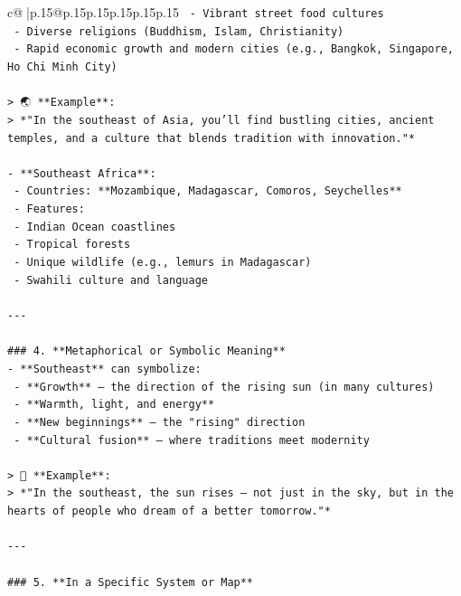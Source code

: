\documentclass{article}
\begin{document}
{\begin{supertabular}{c@{$\;$}|p{.15\linewidth}@{}p{.15\linewidth}p{.15\linewidth}p{.15\linewidth}p{.15\linewidth}p{.15\linewidth}}
{{{\texttt{    {-} Vibrant street food cultures  } \\
\texttt{    {-} Diverse religions (Buddhism, Islam, Christianity)  } \\
\texttt{    {-} Rapid economic growth and modern cities (e.g., Bangkok, Singapore, Ho Chi Minh City)} \\
\\ 
\texttt{> 🌏 **Example**:  } \\
\texttt{> *"In the southeast of Asia, you’ll find bustling cities, ancient temples, and a culture that blends tradition with innovation."*} \\
\\ 
\texttt{{-} **Southeast Africa**:  } \\
\texttt{  {-} Countries: **Mozambique, Madagascar, Comoros, Seychelles**  } \\
\texttt{  {-} Features:  } \\
\texttt{    {-} Indian Ocean coastlines  } \\
\texttt{    {-} Tropical forests  } \\
\texttt{    {-} Unique wildlife (e.g., lemurs in Madagascar)  } \\
\texttt{    {-} Swahili culture and language} \\
\\ 
\texttt{{-}{-}{-}} \\
\\ 
\texttt{\#\#\# 4. **Metaphorical or Symbolic Meaning**  } \\
\texttt{{-} **Southeast** can symbolize:  } \\
\texttt{  {-} **Growth** — the direction of the rising sun (in many cultures)  } \\
\texttt{  {-} **Warmth, light, and energy**  } \\
\texttt{  {-} **New beginnings** — the "rising" direction  } \\
\texttt{  {-} **Cultural fusion** — where traditions meet modernity} \\
\\ 
\texttt{> 🌅 **Example**:  } \\
\texttt{> *"In the southeast, the sun rises — not just in the sky, but in the hearts of people who dream of a better tomorrow."*} \\
\\ 
\texttt{{-}{-}{-}} \\
\\ 
\texttt{\#\#\# 5. **In a Specific System or Map**  } \\
}}}
\end{supertabular}}
\end{document}
